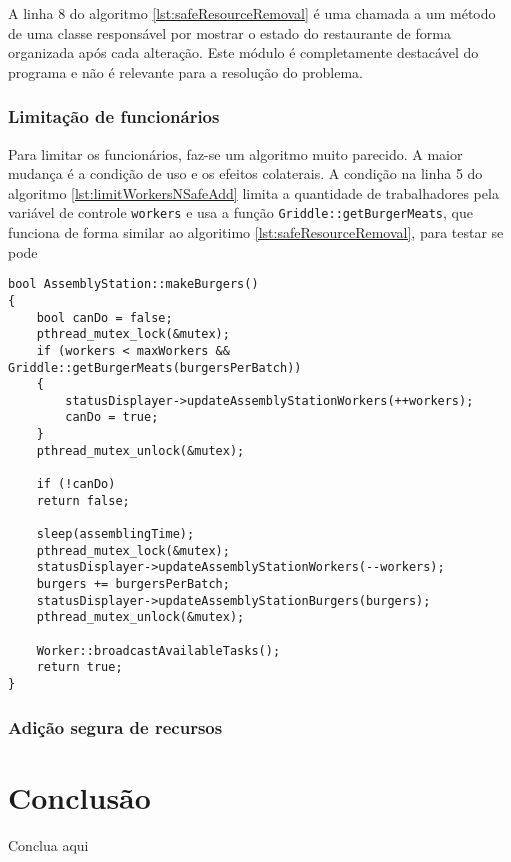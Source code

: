 \documentclass[a4paper]{article}
\begin{document}
A linha 8 do algoritmo \ref{lst:safeResourceRemoval} é uma chamada a um método de uma classe responsável por mostrar o estado do restaurante de forma organizada após cada alteração. Este módulo é completamente destacável do programa e não é relevante para a resolução do problema.

\subsubsection{Limitação de funcionários}

Para limitar os funcionários, faz-se um algoritmo muito parecido. A maior mudança é a condição de uso e os efeitos colaterais. A condição na linha 5 do algoritmo \ref{lst:limitWorkersNSafeAdd}	limita a quantidade de trabalhadores pela variável de controle \texttt{workers} e usa a função \texttt{Griddle::getBurgerMeats}, que funciona de forma similar ao algoritimo \ref{lst:safeResourceRemoval}, para testar se pode

\begin{lstlisting}[caption=Limitação de funcionários e adição segura de recursos\label{lst:limitWorkersNSafeAdd}]
bool AssemblyStation::makeBurgers()
{
	bool canDo = false;
	pthread_mutex_lock(&mutex);
	if (workers < maxWorkers && Griddle::getBurgerMeats(burgersPerBatch))
	{
		statusDisplayer->updateAssemblyStationWorkers(++workers);
		canDo = true;
	}
	pthread_mutex_unlock(&mutex);
	
	if (!canDo)
	return false;
	
	sleep(assemblingTime);
	pthread_mutex_lock(&mutex);
	statusDisplayer->updateAssemblyStationWorkers(--workers);
	burgers += burgersPerBatch;
	statusDisplayer->updateAssemblyStationBurgers(burgers);
	pthread_mutex_unlock(&mutex);
	
	Worker::broadcastAvailableTasks();
	return true;
}
\end{lstlisting}

\subsubsection{Adição segura de recursos}

\section{Conclusão}

Conclua aqui

\printbibliography
\end{document}
